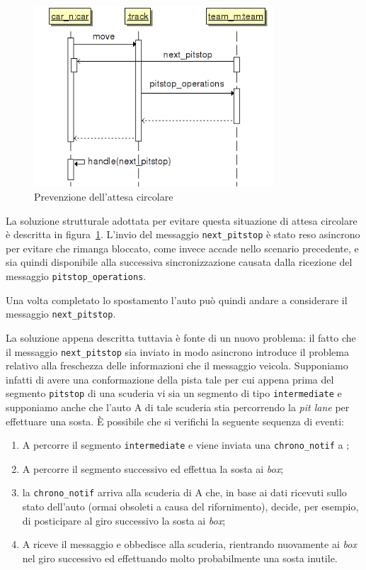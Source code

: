 \begin{figure}
\includegraphics[width=0.8\textwidth]{diagrammi/PitstopSolution}
\caption{Prevenzione dell'attesa circolare}
\label{fig:pitstopSol}
\end{figure}

La soluzione strutturale adottata per evitare questa situazione di attesa circolare è descritta in figura~\ref{fig:pitstopSol}. L'invio del messaggio \texttt{next\_pitstop} è stato reso asincrono per evitare che \team{} rimanga bloccato, come invece accade nello scenario precedente, e sia quindi disponibile alla successiva sincronizzazione causata dalla ricezione del messaggio \texttt{pitstop\_operations}.

Una volta completato lo spostamento l'auto può quindi andare a considerare il messaggio \texttt{next\_pitstop}.

La soluzione appena descritta tuttavia è fonte di un nuovo problema: il fatto che il messaggio \texttt{next\_pitstop} sia inviato in modo asincrono introduce il problema relativo alla freschezza delle informazioni che il messaggio veicola. Supponiamo infatti di avere una conformazione della pista tale per cui appena prima del segmento \texttt{pitstop} di una scuderia vi sia un segmento di tipo \texttt{intermediate} e supponiamo anche che l'auto A di tale scuderia stia percorrendo la \textit{pit lane} per effettuare una sosta.
\`E possibile che si verifichi la seguente sequenza di eventi:
\begin{enumerate}
\item A percorre il segmento \texttt{intermediate} e viene inviata una \texttt{chrono\_notif} a \evdisp{};
\item A percorre il segmento successivo ed effettua la sosta ai \textit{box};
\item la \texttt{chrono\_notif} arriva alla scuderia di A che, in base ai dati ricevuti sullo stato dell'auto (ormai obsoleti a causa del rifornimento), decide, per esempio, di posticipare al giro successivo la sosta ai \textit{box};
\item A riceve il messaggio e obbedisce alla scuderia, rientrando nuovamente ai \textit{box} nel giro successivo ed effettuando molto probabilmente una sosta inutile.
\end{enumerate}

